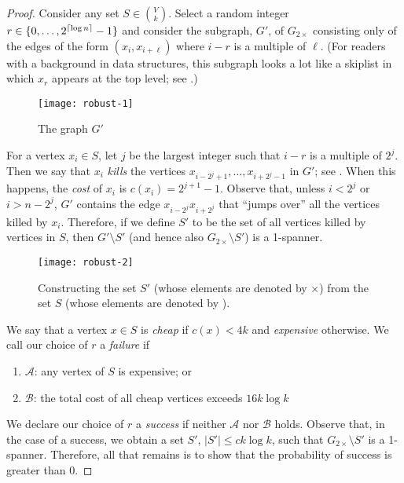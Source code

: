\documentclass{patmorin}
\begin{document}
\begin{proof}
  Consider any set $S\in\binom{V}{k}$.  Select a random integer
  $r\in\{0,\ldots,2^{{\lceil \log n \rceil}}-1\}$ and consider the subgraph,
  $G'$, of $G_{2\times}$ consisting only of the edges of the form
  $(x_i,x_{i+\ell})$ where $i-r$ is a multiple of $\ell$.  (For readers
  with a background in data structures, this subgraph looks a lot like a
  skiplist in which $x_r$ appears at the top level; see .)

  \begin{figure}
    \begin{center}
      \texttt{[image: robust-1]}
    \end{center}
    \caption{The graph $G'$}
  \end{figure}

  For a vertex $x_i\in S$, let $j$ be the largest integer such that
  $i-r$ is a multiple of $2^j$.  Then we say that $x_i$ \emph{kills}
  the vertices $x_{i-2^{j}+1},\ldots,x_{i+2^{j}-1}$ in $G'$; see
  .  When this happens, the \emph{cost} of $x_i$ is
  $c(x_i)=2^{j+1}-1$.  Observe that, unless $i<2^{j}$ or $i>n-2^{j}$,
  $G'$ contains the edge $x_{i-2^{j}}x_{i+2^{j}}$ that ``jumps over''
  all the vertices killed by $x_i$.  Therefore, if we define $S'$ to be
  the set of all vertices killed by vertices in $S$, then $G'\setminus S'$
  (and hence also $G_{2\times}\setminus S'$) is a 1-spanner.
  
  \begin{figure}
    \begin{center}
      \texttt{[image: robust-2]}
    \end{center}
    \caption{Constructing the set $S'$ (whose elements are denoted
    by $\times$)
      from the set $S$ (whose elements are denoted by \textbullet).}
  \end{figure}
  
  We say that a vertex $x\in S$ is \emph{cheap} if $c(x) < 4k$ and
  \emph{expensive} otherwise.  We call our choice of $r$ a \emph{failure}
  if
  \begin{enumerate}
    \item $\mathcal{A}$: any vertex of $S$ is expensive; or
    \item $\mathcal{B}$: the total cost of all cheap vertices exceeds
      $16k\log k$
  \end{enumerate}
  We declare our choice of $r$ a \emph{success} if neither $\mathcal{A}$
  nor $\mathcal{B}$ holds.  Observe that, in the case of a success, we
  obtain a set $S'$, $|S'|\le ck\log k$, such that $G_{2\times}\setminus
  S'$ is a 1-spanner.  Therefore, all that remains is to show that the
  probability of success is greater than 0.
  

\end{proof}
\end{document}
